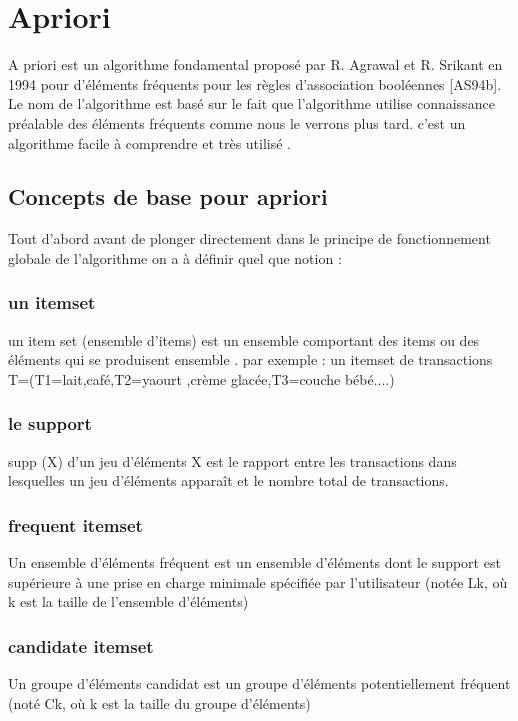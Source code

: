 \documentclass[12pt,a4paper,oneside]{book}
\begin{document}
	
		\def\reportnumber{}
		\def\reporttitle{Algorithme Apriori}
		
		
		
		\sffamily
		
		\setcounter{tocdepth}{3}
		\tableofcontents
		\newpage

		
\chapter{Apriori}

A priori
est un algorithme fondamental proposé par R. Agrawal et R. Srikant en 1994 pour
d’éléments fréquents pour les règles d’association booléennes [AS94b]. 
Le nom de l'algorithme
est basé sur le fait que l'algorithme utilise
connaissance préalable
des éléments fréquents
comme nous le verrons plus tard.
c'est un algorithme facile à comprendre et très utilisé .

\section{Concepts de base pour apriori}
Tout d'abord avant de plonger directement dans le principe de fonctionnement globale de l'algorithme on a à définir quel que notion :
\subsection*{un itemset}
un item set (ensemble d'items) est un ensemble comportant des items ou des éléments qui se produisent ensemble .
par exemple : un itemset de transactions T=(T1={lait,café},T2={yaourt ,crème glacée},T3={couche bébé}....)
\subsection*{le support}
supp (X) d'un jeu d'éléments X est le rapport entre les transactions dans lesquelles un jeu d'éléments apparaît et le nombre total de transactions.
\subsection*{frequent itemset}
Un ensemble d'éléments fréquent est un ensemble d'éléments dont le support est supérieure à une prise en charge minimale spécifiée par l'utilisateur (notée Lk, où k est la taille de l'ensemble d'éléments)
\subsection*{candidate itemset}     
   Un groupe d'éléments candidat est un groupe d'éléments potentiellement fréquent (noté Ck, où k est la taille du groupe d'éléments)
\end{document}
